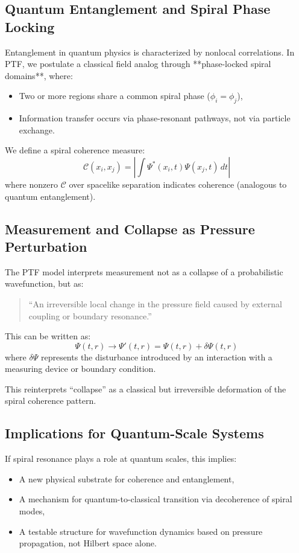 \documentclass[a4paper,12pt]{article}
\begin{document}
\subsection{Quantum Entanglement and Spiral Phase Locking}

Entanglement in quantum physics is characterized by nonlocal correlations. In PTF, we postulate a classical field analog through **phase-locked spiral domains**, where:

\begin{itemize}
    \item Two or more regions share a common spiral phase (\(\phi_i = \phi_j\)),
    \item Information transfer occurs via phase-resonant pathways, not via particle exchange.
\end{itemize}

We define a spiral coherence measure:
\[
\mathcal{C}(x_i, x_j) = \left| \int \Psi^*(x_i, t) \Psi(x_j, t) \, dt \right|
\]
where nonzero \(\mathcal{C}\) over spacelike separation indicates coherence (analogous to quantum entanglement).

\subsection{Measurement and Collapse as Pressure Perturbation}

The PTF model interprets measurement not as a collapse of a probabilistic wavefunction, but as:
\begin{quote}
    “An irreversible local change in the pressure field caused by external coupling or boundary resonance.”
\end{quote}

This can be written as:
\[
\Psi(t, r) \rightarrow \Psi'(t, r) = \Psi(t, r) + \delta \Psi(t, r)
\]
where \(\delta \Psi\) represents the disturbance introduced by an interaction with a measuring device or boundary condition.

This reinterprets “collapse” as a classical but irreversible deformation of the spiral coherence pattern.

\subsection{Implications for Quantum-Scale Systems}

If spiral resonance plays a role at quantum scales, this implies:
\begin{itemize}
    \item A new physical substrate for coherence and entanglement,
    \item A mechanism for quantum-to-classical transition via decoherence of spiral modes,
    \item A testable structure for wavefunction dynamics based on pressure propagation, not Hilbert space alone.
\end{itemize}
\end{document}
